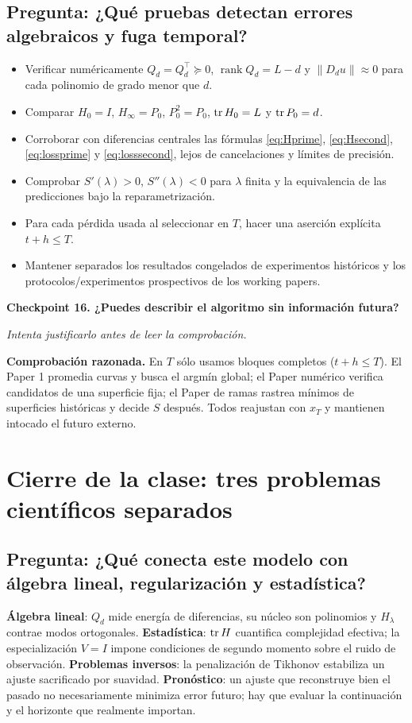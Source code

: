 \documentclass[11pt,letterpaper,parskip=half,headings=small]{scrartcl}
\theoremstyle{definition}\newtheorem{definicion}[proposicion]{Definición}
\theoremstyle{remark}\newtheorem{observacion}[proposicion]{Observación}
\newcommand{\rank}{\operatorname{rank}}\newcommand{\nul}{\operatorname{ker}}
\newcommand{\norm}[1]{\left\lVert#1\right\rVert}\newcommand{\inner}[2]{\left\langle#1,#2\right\rangle}
\newcommand{\pregunta}[1]{\subsection{Pregunta: #1}}
\newcommand{\checkpoint}[3]{%
  \par\medskip\noindent\textbf{\color{blue!45!black}Checkpoint #1. #2}\par
  \noindent\emph{Intenta justificarlo antes de leer la comprobación.}\par
  \noindent\textbf{Comprobación razonada. }#3\par\bigskip
}
\begin{document}
\pregunta{¿Qué pruebas detectan errores algebraicos y fuga temporal?}
\begin{itemize}
\item Verificar numéricamente $Q_d=Q_d^\top\succeq0$, $\rank Q_d=L-d$ y $\norm{D_du}\approx0$ para cada polinomio de grado menor que $d$.
\item Comparar $H_0=I$, $H_\infty=P_0$, $P_0^2=P_0$, $\operatorname{tr} H_0=L$ y $\operatorname{tr} P_0=d$.
\item Corroborar con diferencias centrales las fórmulas \eqref{eq:Hprime}, \eqref{eq:Hsecond}, \eqref{eq:lossprime} y \eqref{eq:losssecond}, lejos de cancelaciones y límites de precisión.
\item Comprobar $S'(\lambda)>0$, $S''(\lambda)<0$ para $\lambda$ finita y la equivalencia de las predicciones bajo la reparametrización.
\item Para cada pérdida usada al seleccionar en $T$, hacer una aserción explícita $t+h\leq T$.
\item Mantener separados los resultados congelados de experimentos históricos y los protocolos/experimentos prospectivos de los working papers.
\end{itemize}

\checkpoint{16}{¿Puedes describir el algoritmo sin información futura?}{En $T$ sólo usamos bloques completos ($t+h\leq T$). El Paper 1 promedia curvas y busca el argmín global; el Paper numérico verifica candidatos de una superficie fija; el Paper de ramas rastrea mínimos de superficies históricas y decide $S$ después. Todos reajustan con $x_T$ y mantienen intocado el futuro externo.}

\section{Cierre de la clase: tres problemas científicos separados}
\pregunta{¿Qué conecta este modelo con álgebra lineal, regularización y estadística?}
\textbf{Álgebra lineal}: $Q_d$ mide energía de diferencias, su núcleo son polinomios y $H_\lambda$ contrae modos ortogonales. \textbf{Estadística}: $\operatorname{tr} H$ cuantifica complejidad efectiva; la especialización $V=I$ impone condiciones de segundo momento sobre el ruido de observación. \textbf{Problemas inversos}: la penalización de Tikhonov estabiliza un ajuste sacrificado por suavidad. \textbf{Pronóstico}: un ajuste que reconstruye bien el pasado no necesariamente minimiza error futuro; hay que evaluar la continuación y el horizonte que realmente importan.
\end{document}
